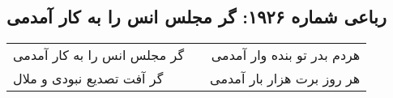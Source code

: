 \begin{center}
\section*{رباعی شماره ۱۹۲۶: گر مجلس انس را به کار آمدمی}
\label{sec:1926}
\begin{longtable}{l p{0.5cm} r}
گر مجلس انس را به کار آمدمی
&&
هردم بدر تو بنده وار آمدمی
\\
گر آفت تصدیع نبودی و ملال
&&
هر روز برت هزار بار آمدمی
\\
\end{longtable}
\end{center}
